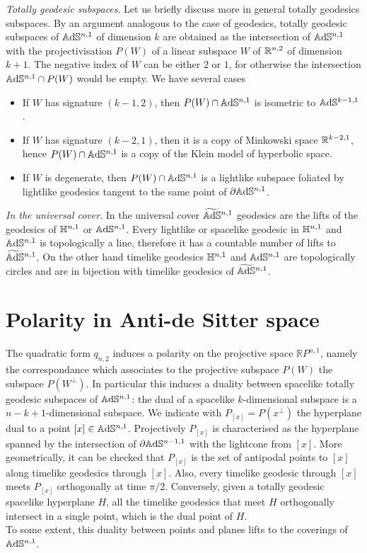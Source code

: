 \textit{Totally geodesic subspaces}. Let us briefly discuss more in general totally geodesics subspaces. By an argument analogous to the case of geodesics, totally geodesic subspaces of $\mathbb{A}\mathrm{d}\mathbb{S}^{n,1}$ of dimension $k$ are obtained as the intersection of $\mathbb{A}\mathrm{d}\mathbb{S}^{n,1}$ with the projectivisation $P(W)$ of a linear subspace $W$ of $\mathbb{R}^{n,2}$ of dimension $k+1$. The negative index of $W$ can be either $2$ or $1$, for otherwise the intersection $\mathbb{A}\mathrm{d}\mathbb{S}^{n,1}\cap P(W)$ would be empty.
We have several cases
\begin{itemize}
    \item If $W$ has signature $(k-1,2)$, then $P(W)\cap\mathbb{A}\mathrm{d}\mathbb{S}^{n,1}$  is isometric to $\mathbb{A}\mathrm{d}\mathbb{S}^{k-1,1}$.
    \item If $W$ has signature $(k-2,1)$, then it is a copy of Minkowski space $\mathbb{R}^{k-2,1}$, hence $P(W)\cap\mathbb{A}\mathrm{d}\mathbb{S}^{n,1}$ is a copy of the Klein model of hyperbolic space.
    \item If $W$ is degenerate, then $P(W)\cap\mathbb{A}\mathrm{d}\mathbb{S}^{n,1}$ is a lightlike subspace foliated by lightlike geodesics tangent to the same point of $\partial\mathbb{A}\mathrm{d}\mathbb{S}^{n,1}$. 
\end{itemize}

\textit{In the universal cover}. In the universal cover $\widetilde{\mathbb{A}\mathrm{d}\mathbb{S}}{}^{n,1}$ geodesics are the lifts of the geodesics of $\mathbb{H}^{n,1}$ or $\mathbb{A}\mathrm{d}\mathbb{S}^{n,1}$. Every lightlike or spacelike geodesic in $\mathbb{H}^{n,1}$ and $\mathbb{A}\mathrm{d}\mathbb{S}^{n,1}$ is topologically a line, therefore it has a countable number of lifts to $\widetilde{\mathbb{A}\mathrm{d}\mathbb{S}}{}^{n,1}$, On the other hand timelike geodesics $\mathbb{H}^{n,1}$ and $\mathbb{A}\mathrm{d}\mathbb{S}^{n,1}$ are topologically circles and are in bijection with timelike geodesics of $\widetilde{\mathbb{A}\mathrm{d}\mathbb{S}}{}^{n,1}$.\\


\section{Polarity in Anti-de Sitter space}
The quadratic form $q_{n,2}$ induces a polarity on the projective space $\mathbb{R}P^{n,1}$, namely the correspondance which associates to the projective subspace $P(W)$ the subspace $P(W^ \perp)$. In particular this induces a duality between spacelike totally geodesic subspaces of $\mathbb{A}\mathrm{d}\mathbb{S}^{n,1}$: the dual of a spacelike $k$-dimensional subspace is a $n-k+1$-dimensional subspace.
We indicate with $P_{[x]}=P(x^\perp)$ the hyperplane dual to a point $[x]\in \mathbb{A}\mathrm{d}\mathbb{S}^{n,1}$.
Projectively $P_{[x]}$ is characterised as the hyperplane spanned by the intersection of $\partial\mathbb{A}\mathrm{d}\mathbb{S}^{n-1,1}$ with the lightcone from $[x]$.
More geometrically, it can be checked that $P_{[x]}$ is the set of antipodal points to $[x]$ along timelike geodesics through $[x]$. Also, every timelike geodesic
through $[x]$ meets $P_{[x]}$ orthogonally at time $\pi/2$. Conversely, given a totally geodesic spacelike hyperplane $H$, all the timelike geodesics that meet $H$ orthogonally  intersect in a single point, which is the dual point of $H$.\\
To some extent, this duality between points and planes lifts to the coverings of $\mathbb{A}\mathrm{d}\mathbb{S}^{n,1}$.\\

